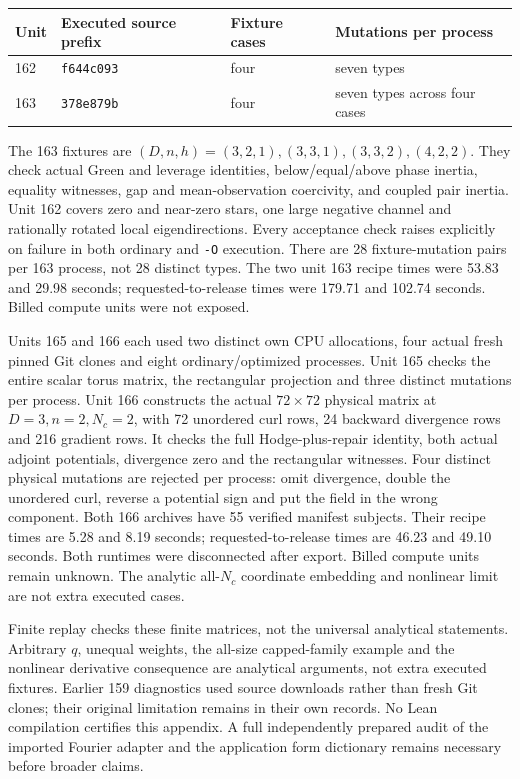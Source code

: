 \documentclass[11pt]{article}
\begin{document}
\begin{center}\small
\begin{tabular}{llll}
\toprule
Unit & Executed source prefix & Fixture cases & Mutations per process\\
\midrule
162 & \texttt{f644c093} & four & seven types\\
163 & \texttt{378e879b} & four & seven types across four cases\\
\bottomrule
\end{tabular}
\end{center}
The 163 fixtures are $(D,n,h)=(3,2,1),(3,3,1),(3,3,2),(4,2,2)$.
They check actual Green and leverage identities, below/equal/above phase
inertia, equality witnesses, gap and mean-observation coercivity, and coupled
pair inertia. Unit 162 covers zero and near-zero stars, one large negative
channel and rationally rotated local eigendirections. Every acceptance check
raises explicitly on failure in both ordinary and \texttt{-O} execution.
There are 28 fixture-mutation pairs per 163 process, not 28 distinct types.
The two unit 163 recipe times were 53.83 and 29.98 seconds; requested-to-release
times were 179.71 and 102.74 seconds. Billed compute units were not exposed.

Units 165 and 166 each used two distinct own CPU allocations, four actual
fresh pinned Git clones and eight ordinary/optimized processes. Unit 165
checks the entire scalar torus matrix, the rectangular projection and three
distinct mutations per process. Unit 166 constructs the actual $72\times72$
physical matrix at $D=3,n=2,N_c=2$, with 72 unordered curl rows, 24 backward
divergence rows and 216 gradient rows. It checks the full Hodge-plus-repair
identity, both actual adjoint potentials, divergence zero and the rectangular
witnesses. Four distinct physical mutations are rejected per process: omit
divergence, double the unordered curl, reverse a potential sign and put the
field in the wrong component. Both 166 archives have 55 verified manifest
subjects. Their recipe times are 5.28 and 8.19 seconds; requested-to-release
times are 46.23 and 49.10 seconds. Both runtimes were disconnected after
export. Billed compute units remain unknown. The analytic all-$N_c$ coordinate
embedding and nonlinear limit are not extra executed cases.

Finite replay checks these finite matrices, not the universal analytical
statements. Arbitrary $q$, unequal weights, the all-size capped-family example
and the nonlinear derivative consequence are analytical arguments, not extra
executed fixtures. Earlier 159 diagnostics used source downloads rather than
fresh Git clones; their original limitation remains in their own records.
No Lean compilation certifies this appendix. A full independently prepared
audit of the imported Fourier adapter and the application form dictionary
remains necessary before broader claims.
\end{document}
